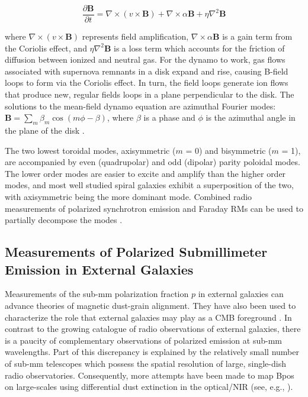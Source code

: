 \begin{equation}\label{eq:dynamo}
\frac{\partial \textbf{B}}{\partial t} = \nabla \times (v \times \textbf{B}) + \nabla \times \alpha \textbf{B} + \eta \nabla^{2} \textbf{B}
\end{equation}

where $\nabla \times (v \times \textbf{B})$ represents field amplification, $\nabla \times \alpha \textbf{B}$ is a gain term from the Coriolis effect, and $\eta \nabla^{2} \textbf{B}$ is a loss term which accounts for the friction of diffusion between ionized and neutral gas. For the dynamo to work, gas flows associated with supernova remnants in a disk expand and rise, causing B-field loops to form via the Coriolis effect. In turn, the field loops generate ion flows that produce new, regular fields loops in a plane perpendicular to the disk. The solutions to the mean-field dynamo equation are azimuthal Fourier modes: $\boldsymbol{B} = \sum_{m} \beta_{m}\cos(m\phi - \beta)$, where $\beta$ is a phase and $\phi$ is the azimuthal angle in the plane of the disk \citep{sofue1985large}.

The two lowest toroidal modes, axisymmetric ($m$ = 0) and bisymmetric ($m$ = 1), are accompanied by even (quadrupolar) and odd (dipolar) parity poloidal modes. The lower order modes are easier to excite and amplify than the higher order modes, and most well studied spiral galaxies exhibit a superposition of the two, with axisymmetric being the more dominant mode. Combined radio measurements of polarized synchrotron emission and Faraday RMs can be used to partially decompose the modes \citep{beck2008measuring}.

\subsection{Measurements of Polarized Submillimeter Emission in External Galaxies}

Measurements of the sub-mm polarization fraction $p$ in external galaxies can advance theories of magnetic dust-grain alignment. They have also been used to characterize the role that external galaxies may play as a CMB foreground \citep{seiffert2006upper}. In contrast to the growing catalogue of radio observations of external galaxies, there is a paucity of complementary observations of polarized emission at sub-mm wavelengths. Part of this discrepancy is explained by the relatively small number of sub-mm telescopes which possess the spatial resolution of large, single-dish radio observatories. Consequently, more attempts have been made to map \gls{Bpos} on large-scales using differential dust extinction in the optical/NIR (see, e.g., \citet{fendt1998spiral}).

